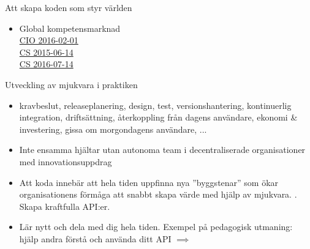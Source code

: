 \begin{SlideExtra}{Att skapa koden som styr världen}
\begin{multicols}{2}
\begin{itemize}
\item Global kompetensmarknad \\
  \href{https://cio.idg.se/2.1782/1.648294/hitta-it-kompetens/sida/2/global-rekrytering-aktivt-hr-arbete}{CIO 2016-02-01}\\
  \href{http://computersweden.idg.se/2.2683/1.630901/det-finns-programmerare-och-sa-finns-det-programmerare}{CS 2015-06-14} \\
  \href{http://computersweden.idg.se/2.2683/1.662186/25-miljoner-utvecklare?queryText=miljoner\%20utvecklare}{CS 2016-07-14 }
\end{itemize}
\end{multicols}

\end{SlideExtra}

\begin{SlideExtra}{Utveckling av mjukvara i praktiken}
\begin{itemize}
\item {} kravbeslut, releaseplanering, design, test, versionshantering, kontinuerlig integration, driftsättning, återkoppling från dagens användare, ekonomi \& investering, gissa om morgondagens användare, ...
\item {} Inte ensamma hjältar utan autonoma team i decentraliserade organisationer med innovationsuppdrag
\item {} Att koda innebär att hela tiden uppfinna nya ''byggstenar'' som ökar organisationens förmåga att snabbt skapa värde med hjälp av mjukvara. . Skapa kraftfulla API:er.
\item {} Lär nytt och dela med dig hela tiden. Exempel på pedagogisk utmaning: hjälp andra förstå och använda ditt API $\implies$ 
\end{itemize}
\end{SlideExtra}


\fi %


\ifkompendium\else
{}
\fi


\ifkompendium\else
{}
\fi

